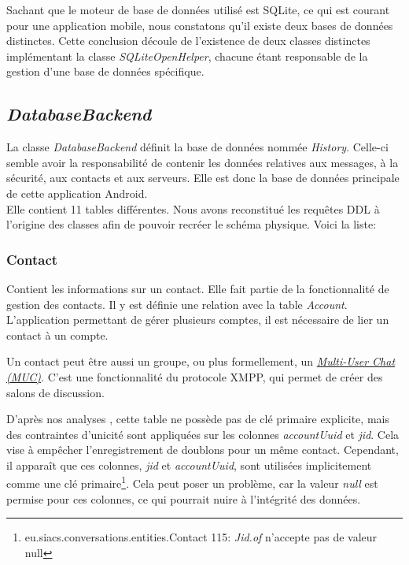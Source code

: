 \documentclass[a4paper,11pt]{article}
\begin{document}
Sachant que le moteur de base de données utilisé est SQLite, ce qui est courant pour une application mobile, nous constatons qu'il existe deux bases de données distinctes. Cette conclusion découle de l'existence de deux classes distinctes implémentant la classe \textit{SQLiteOpenHelper}, chacune étant responsable de la gestion d'une base de données spécifique.

\subsection*{\textit{DatabaseBackend}}

La classe \textit{DatabaseBackend} définit la base de données nommée \textit{History}. Celle-ci semble avoir la responsabilité de contenir les données relatives aux messages, à la sécurité, aux contacts et aux serveurs. Elle est donc la base de données principale de cette application Android.\\
Elle contient 11 tables différentes. Nous avons reconstitué les requêtes DDL à l'origine des classes afin de pouvoir recréer le schéma physique. Voici la liste:

\subsubsection*{Contact}
Contient les informations sur un contact. Elle fait partie de la fonctionnalité de gestion des contacts. Il y est définie une relation avec la table \textit{Account}. L'application permettant de gérer plusieurs comptes, il est nécessaire de lier un contact à un compte.

Un contact peut être aussi un groupe, ou plus formellement, un \href{https://xmpp.org/extensions/xep-0045.html}{\textit{Multi-User Chat (MUC)}}. C'est une fonctionnalité du protocole XMPP, qui permet de créer des salons de discussion.

D'après nos analyses , cette table ne possède pas de clé primaire explicite, mais des contraintes d'unicité sont appliquées sur les colonnes \textit{accountUuid} et \textit{jid}. Cela vise à empêcher l'enregistrement de doublons pour un même contact. Cependant, il apparaît que ces colonnes, \textit{jid} et \textit{accountUuid}, sont utilisées implicitement comme une clé primaire\footnote{eu.siacs.conversations.entities.Contact 115: \textit{Jid.of} n'accepte pas de valeur null}. Cela peut poser un problème, car la valeur \textit{null} est permise pour ces colonnes, ce qui pourrait nuire à l'intégrité des données.
\end{document}
